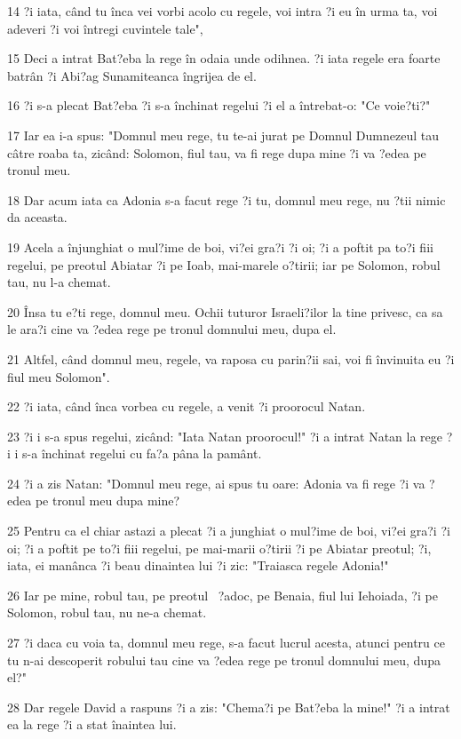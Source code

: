 \par 14 ?i iata, când tu înca vei vorbi acolo cu regele, voi intra ?i eu în urma ta, voi adeveri ?i voi întregi cuvintele tale",
\par 15 Deci a intrat Bat?eba la rege în odaia unde odihnea. ?i iata regele era foarte batrân ?i Abi?ag Sunamiteanca îngrijea de el.
\par 16 ?i s-a plecat Bat?eba ?i s-a închinat regelui ?i el a întrebat-o: "Ce voie?ti?"
\par 17 Iar ea i-a spus: "Domnul meu rege, tu te-ai jurat pe Domnul Dumnezeul tau câtre roaba ta, zicând: Solomon, fiul tau, va fi rege dupa mine ?i va ?edea pe tronul meu.
\par 18 Dar acum iata ca Adonia s-a facut rege ?i tu, domnul meu rege, nu ?tii nimic da aceasta.
\par 19 Acela a înjunghiat o mul?ime de boi, vi?ei gra?i ?i oi; ?i a poftit pa to?i fiii regelui, pe preotul Abiatar ?i pe Ioab, mai-marele o?tirii; iar pe Solomon, robul tau, nu l-a chemat.
\par 20 Însa tu e?ti rege, domnul meu. Ochii tuturor Israeli?ilor la tine privesc, ca sa le ara?i cine va ?edea rege pe tronul domnului meu, dupa el.
\par 21 Altfel, când domnul meu, regele, va raposa cu parin?ii sai, voi fi învinuita eu ?i fiul meu Solomon".
\par 22 ?i iata, când înca vorbea cu regele, a venit ?i proorocul Natan.
\par 23 ?i i s-a spus regelui, zicând: "Iata Natan proorocul!" ?i a intrat Natan la rege ?i i s-a închinat regelui cu fa?a pâna la pamânt.
\par 24 ?i a zis Natan: "Domnul meu rege, ai spus tu oare: Adonia va fi rege ?i va ?edea pe tronul meu dupa mine?
\par 25 Pentru ca el chiar astazi a plecat ?i a junghiat o mul?ime de boi, vi?ei gra?i ?i oi; ?i a poftit pe to?i fiii regelui, pe mai-marii o?tirii ?i pe Abiatar preotul; ?i, iata, ei manânca ?i beau dinaintea lui ?i zic: "Traiasca regele Adonia!"
\par 26 Iar pe mine, robul tau, pe preotul  ?adoc, pe Benaia, fiul lui Iehoiada, ?i pe Solomon, robul tau, nu ne-a chemat.
\par 27 ?i daca cu voia ta, domnul meu rege, s-a facut lucrul acesta, atunci pentru ce tu n-ai descoperit robului tau cine va ?edea rege pe tronul domnului meu, dupa el?"
\par 28 Dar regele David a raspuns ?i a zis: "Chema?i pe Bat?eba la mine!" ?i a intrat ea la rege ?i a stat înaintea lui.
